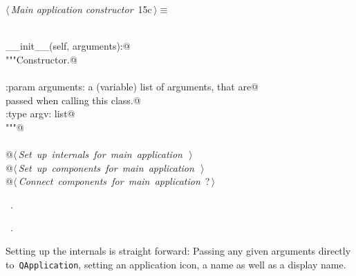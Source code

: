 \documentclass[
    a4paper,      %
    10pt,         %
    openright,    %
    notitlepage,  %
    parskip=half, %
]{scrreprt}       %
\theoremstyle{definition}                    %
\begin{document}
\begin{flushleft} \small
\begin{minipage}{\linewidth}\label{scrap4}\raggedright\small
{} $\langle\,${\itshape Main application constructor}\nobreak\ {\footnotesize {15c}}$\,\rangle\equiv$
\vspace{-1ex}
\begin{list}{}{} \item
\mbox{}\lstinline@@\\
\mbox{}\lstinline@def __init__(self, arguments):@\\
\mbox{}\lstinline@    """Constructor.@\\
\mbox{}\lstinline@@\\
\mbox{}\lstinline@    :param arguments: a (variable) list of arguments, that are@\\
\mbox{}\lstinline@                      passed when calling this class.@\\
\mbox{}\lstinline@    :type  argv:      list@\\
\mbox{}\lstinline@    """@\\
\mbox{}\lstinline@@\\
\mbox{}\lstinline@    @\hbox{$\langle\,${\itshape Set up internals for main application}\nobreak\ {\footnotesize {}}$\,\rangle$}\lstinline@@\\
\mbox{}\lstinline@    @\hbox{$\langle\,${\itshape Set up components for main application}\nobreak\ {\footnotesize {}}$\,\rangle$}\lstinline@@\\
\mbox{}\lstinline@    @\hbox{$\langle\,${\itshape Connect components for main application}\nobreak\ {\footnotesize ?}$\,\rangle$}\lstinline@@\\
\mbox{}\lstinline@@{\NWsep}
\end{list}
\vspace{-1.5ex}
\footnotesize
\begin{list}{}{\setlength{\itemsep}{-\parsep}\setlength{\itemindent}{-\leftmargin}}
\item \NWtxtMacroDefBy\ .
\item \NWtxtMacroRefIn\ .

\item{}
\end{list}
\end{minipage}\vspace{4ex}
\end{flushleft}
Setting up the internals is straight forward: Passing any given arguments
directly to~\verb+QApplication+, setting an application icon, a name as well as
a display name.
\end{document}
